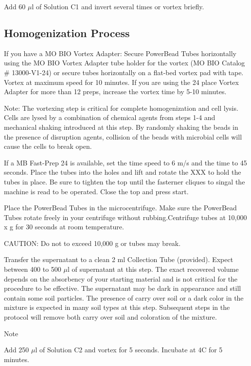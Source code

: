 \documentclass[12pt]{../SOP3_alpha}\usepackage[]{graphicx}\usepackage[]{color}
\begin{document}
\NP Add 60 $\mu$l of Solution C1 and invert several times or vortex briefly.

\subsection*{Homogenization Process} 

\NP If you have a MO BIO Vortex Adapter: Secure PowerBead Tubes horizontally using the MO BIO Vortex Adapter tube holder for the vortex (MO BIO Catalog \# 13000-V1-24) or secure tubes
horizontally on a flat-bed vortex pad with tape. Vortex at maximum speed for 10 minutes. If you are using the 24 place Vortex Adapter for more than 12 preps, increase the vortex time by 5-10 minutes. 

\noindent Note: The vortexing step is critical for complete homogenization and cell lysis. Cells are lysed by a combination of chemical agents from steps 1-4 and mechanical shaking introduced at this step. By randomly shaking the beads in the presence of disruption agents, collision of the beads with microbial cells will cause the cells to break open.

\NP If a MB Fast-Prep 24 is available, set the time speed to 6 m/s and the time to 45 seconds. Place the tubes into the holes and lift and rotate the XXX to hold the tubes in place. Be sure to tighten the top until the fasterner cliques to singal the machine is read to be operated. Close the top and press start.


\NP Place the PowerBead Tubes in the microcentrifuge. Make sure the PowerBead Tubes rotate freely in your centrifuge without rubbing.Centrifuge tubes at 10,000 x g for 30 seconds at room temperature. 

\noindent CAUTION: Do not to exceed 10,000 g or tubes may break.

\NP Transfer the supernatant to a clean 2 ml Collection Tube (provided). Expect between 400 to 500 $\mu$l of supernatant at this step. The exact recovered volume depends on the absorbency of
your starting material and is not critical for the procedure to be effective. The supernatant may be dark in appearance and still contain some soil particles. The presence of carry over soil or a dark color in the mixture is expected in many
soil types at this step. Subsequent steps in the protocol will remove both carry over soil and coloration of the mixture.

Note

\NP Add 250 $\mu$l of Solution C2 and vortex for 5 seconds. Incubate at 4\degree C for 5
minutes.
\end{document}
